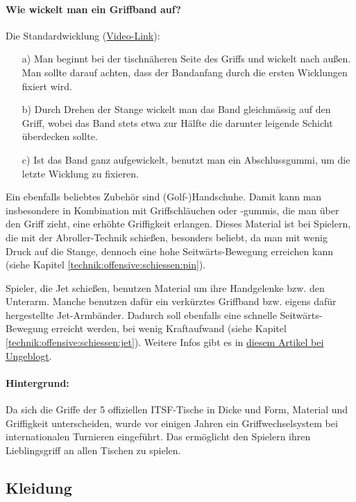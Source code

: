 \paragraph{Wie wickelt man ein Griffband auf?} Die Standardwicklung (\href{https://www.youtube.com/watch?v=KgOqDdcp4n4}{Video-Link}):
\begin{itemize}
    \item[a)] Man beginnt bei der tischnäheren Seite des Griffs und wickelt nach außen.
        Man sollte darauf achten, dass der Bandanfang durch die ersten Wicklungen fixiert wird. 
    \item[b)] Durch Drehen der Stange wickelt man das Band gleichmässig auf den Griff, wobei das Band stets etwa zur Hälfte die darunter leigende Schicht überdecken sollte.
    \item[c)] Ist das Band ganz aufgewickelt, benutzt man ein Abschlussgummi, um die letzte Wicklung zu fixieren.
\end{itemize}

Ein ebenfalls beliebtes Zubehör sind (Golf-)Handschuhe. 
Damit kann man insbesondere in Kombination mit Griffschläuchen oder -gummis, die man über den Griff zieht, eine erhöhte Griffigkeit erlangen.
Dieses Material ist bei Spielern, die mit der Abroller-Technik schießen, besonders beliebt, da man mit wenig Druck auf die Stange, dennoch eine hohe Seitwärts-Bewegung erreichen kann (siehe Kapitel \ref{technik:offensive:schiessen:pin}).  

Spieler, die Jet schießen, benutzen Material um ihre Handgelenke bzw. den Unterarm. 
Manche benutzen dafür ein verkürztes Griffband bzw. eigens dafür hergestellte Jet-Armbänder.
Dadurch soll ebenfalls eine schnelle Seitwärts-Bewegung erreicht werden, bei wenig Kraftaufwand (siehe Kapitel \ref{technik:offensive:schiessen:jet}).
Weitere Infos gibt es in \href{http://ungeblogtkickern.blogspot.de/2015/05/griffe-praparieren.html}{diesem Artikel bei Ungeblogt}.

\paragraph{Hintergrund:} Da sich die Griffe der 5 offiziellen ITSF-Tische in Dicke und Form, Material und Griffigkeit unterscheiden, wurde vor einigen Jahren ein Griffwechselsystem bei internationalen Turnieren eingeführt.
Das ermöglicht den Spielern ihren Lieblingsgriff an allen Tischen zu spielen. 


\subsection{Kleidung}
\label{tisch:zubehoer:kleidung}

